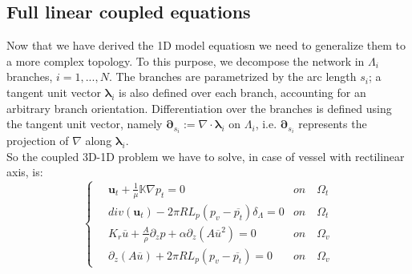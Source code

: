\documentclass[a4paper]{report}
\begin{document}
\subsection{Full linear coupled equations}
Now that we have derived the 1D model equatiosn we need to generalize them to a more complex topology.
To this purpose, we decompose the network in $\Lambda_i$ branches, $i=1,...,N$. The branches are parametrized by the arc length $s_i$; a tangent unit vector $\boldsymbol{\lambda}_i$ is also defined over each branch, accounting for an arbitrary branch orientation. Differentiation over the branches is defined using the tangent unit vector, namely $\boldsymbol{\partial}_{s_i}:=\nabla \cdot \boldsymbol{\lambda}_i$ on $\Lambda_i$, i.e. $\boldsymbol{\partial}_{s_i}$ represents the projection of $\nabla$ along $\boldsymbol{\lambda}_i$.\\
So the coupled 3D-1D problem we have to solve, in case of vessel with rectilinear axis, is:
\begin{equation}
\begin{cases}
\quad \mathbf{u}_t + \frac{1}{\mu} \boldsymbol{\mathbb{K}} \nabla p_t =0 &  on \quad \Omega_t\\
\quad  div(\mathbf{u}_t)- 2 \pi R L_p (p_v -\overline{p_t}) \delta_{\Lambda}=0& on \quad \Omega_t\\
\quad  K_r \overline{u}+ \frac{A}{\rho} \partial_{z} p + \alpha \partial_z (A \overline{u}^2)=0& on \quad \Omega_v \\
\quad 	\partial_{z}(A \overline{u})+2 \pi R L_p (p_v -\overline{p_t})=0 & on \quad \Omega_v
\end{cases}
\end{equation}
\end{document}
